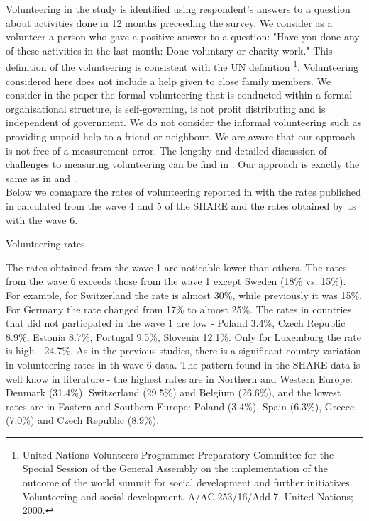 \documentclass[10pt, letterpaper]{article}
\begin{document}
\begin{spacing}{1.4}
Volunteering in the study is identified using respondent's answers to a question about activities done in 12 months preceeding the survey. We consider as a volunteer a person who gave a positive answer to a question: "Have you done any of these activities in the last month: Done voluntary or charity work."  This definition of the volunteering is consistent with the UN definition \footnote{United Nations Volunteers Programme: Preparatory Committee for the Special Session of the General Assembly on the implementation of the outcome of the world summit for social development and further initiatives. Volunteering and social development. A/AC.253/16/Add.7. United Nations; 2000.}. Volunteering considered here  does not include a help given to close family members. We consider in the paper the formal volunteering that is conducted within a formal organisational structure, is self-governing, is not profit distributing and is independent of government. We do not consider the informal volunteering such as providing unpaid help to a friend or neighbour. We are aware that our approach is not free of a measurement error. The lengthy and detailed discussion of challenges to measuring volunteering can be find in \citet{salomon2017}. Our approach is exactly the same as in \citet{haski09} and \citet{oecd2015}. \\

Below we comapare the rates of volunteering reported in \citet{haski09} with the rates published in \citet{oecd2015} calculated from the wave 4 and 5 of the SHARE and the rates obtained by us with the wave 6.  \\

\begin{spacing}{.9}
\begin{table}[H]
\centering 
\caption{Volunteering rates}  
\begin{scriptsize} 
	 
      \label{Rates} 
\end{scriptsize}
\end{table}
\end{spacing}


The rates obtained from the wave 1 are noticable lower than others. The rates from the wave 6 exceeds those from the wave 1 except Sweden (18\% vs. 15\%).  For example, for Switzerland the rate is almost 30\%, while previously it was 15\%. For Germany the rate changed from 17\% to almost 25\%. The rates in countries that did not particpated in the wave 1 are low - Poland 3.4\%, Czech Republic 8.9\%, Estonia 8.7\%, Portugal 9.5\%, Slovenia 12.1\%. Only for Luxemburg the rate is high - 24.7\%. As in the previous studies, there is a significant country variation in volunteering rates in th wave 6 data. The pattern found in the SHARE data is well know in literature - the highest rates are in Northern and Western Europe:  Denmark (31.4\%), Switzerland (29.5\%) and Belgium (26.6\%), and the lowest rates are in Eastern and Southern Europe: Poland (3.4\%), Spain (6.3\%), Greece (7.0\%) and Czech Republic (8.9\%). \\


\end{spacing}
\end{document}
